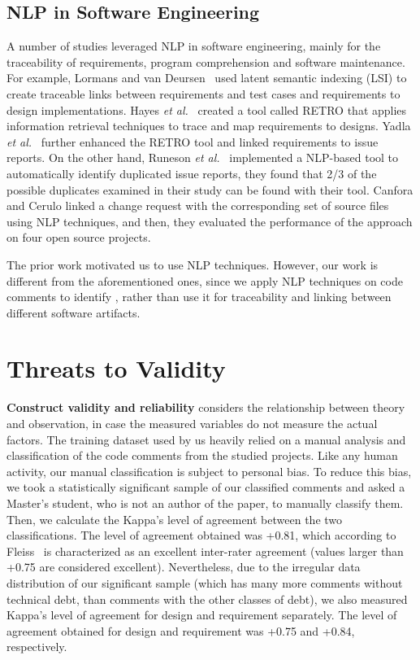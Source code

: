 \subsection{NLP in Software Engineering}

A number of studies leveraged NLP in software engineering, mainly for the traceability of requirements, program comprehension and software maintenance. For example, Lormans and van Deursen~\cite{Lormans2006CSRM} used latent semantic indexing (LSI) to create traceable links between requirements and test cases and requirements to design implementations. Hayes \textit{et al.}~\cite{Hayes2005, Hayes2006TSE} created a tool called RETRO that applies information retrieval techniques to trace and map requirements to designs. Yadla \textit{et al.}~\cite{yadla2005tracing} further enhanced the RETRO tool and linked requirements to issue reports. On the other hand, Runeson \textit{et al.}~\cite{Runeson2007ICSE} implemented a NLP-based tool to automatically identify duplicated issue reports, they found that 2/3 of the possible duplicates examined in their study can be found with their tool. Canfora and Cerulo \cite{Canfora2005ISSM} linked a change request with the corresponding set of source files using NLP techniques, and then, they evaluated the performance of the approach on four open source projects.  

The prior work motivated us to use NLP techniques. However, our work is different from the aforementioned ones, since we apply NLP techniques on code comments to identify \SATD, rather than use it for traceability and linking between different software artifacts.

\section{Threats to Validity}
\label{chap4:sec:threats_to_validity}

\noindent\textbf{Construct validity and reliability} considers the relationship between theory and observation, in case the measured variables do not measure the actual factors. The training dataset used by us heavily relied on a manual analysis and classification of the code comments from the studied projects. Like any human activity, our manual classification is subject to personal bias. To reduce this bias, we took a statistically significant sample of our classified comments and asked a Master's student, who is not an author of the paper, to manually classify them. Then, we calculate the Kappa's level of agreement between the two classifications. The level of agreement obtained was +0.81, which according to Fleiss~\cite{Fleiss1981measurement} is characterized as an excellent inter-rater agreement (values larger than +0.75 are considered excellent). Nevertheless, due to the irregular data distribution of our significant sample (which has many more comments without technical debt, than comments with the other classes of debt), we also measured Kappa's level of agreement for design and requirement \SATD separately. The level of agreement obtained for design and requirement \SATD was +0.75 and +0.84, respectively.

